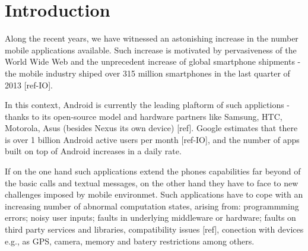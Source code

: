 \documentclass[conference]{IEEEtran}
\begin{document}

\section{Introduction}

Along the recent years, we have witnessed an astonishing increase in the number 
mobile applications available. Such increase is motivated by pervasiveness of the World Wide Web 
and the unprecedent increase of global smartphone shipments -
the mobile industry shiped over 315 million smartphones in the last quarter of 2013 [ref-IO].


In this context, Android is currently the leading plaftorm of such applictions - thanks to its open-source 
model and hardware partners like Samsung, HTC, Motorola, Asus (besides Nexus its
 own device) [ref].  Google estimates that there is over 1 billion Android active users per month [ref-IO],
and the number of apps built on top of Android increases in a daily rate.


If on the one hand such applications extend the phones capabilities 
far beyond of the basic calls and textual messages, on the other hand
they have to face to new challenges imposed by mobile environmet.
Such applications have to cope with an increasing number of abnormal
computation states, arising from: programmming errors;
 noisy user inputs; faults in underlying middleware or hardware; 
faults on third party services and libraries, compatibility issues [ref], 
conection with devices e.g., as GPS, camera, memory and batery restrictions
among others.
\end{document}
